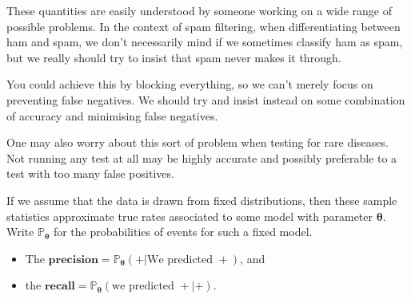 \documentclass[10pt,a4paper]{article}
\begin{document}
These quantities are easily understood by someone working on a wide range of possible problems.
In the context of spam filtering, when differentiating between ham and spam, we don't necessarily mind if we sometimes classify ham as spam, but we really should try to insist that spam never makes it through.

You could achieve this by blocking everything, so we can't merely focus on preventing false negatives.
We should try and insist instead on some combination of accuracy and minimising false negatives.

One may also worry about this sort of problem when testing for rare diseases.
Not running any test at all may be highly accurate and possibly preferable to a test with too many false positives.

If we assume that the data is drawn from fixed distributions, then these sample statistics approximate true rates associated to some model with parameter $\boldsymbol\theta$.
Write $\mathbb P_{\boldsymbol\theta}$ for the probabilities of events for such a fixed model.
\begin{itemize}
\item The $\textbf{precision}=\mathbb P_{\boldsymbol\theta}(+|\text{We predicted }+)$, and
\item the $\textbf{recall}=\mathbb P_{\boldsymbol\theta}(\text{we predicted }+|+)$.
\end{itemize}
\end{document}
